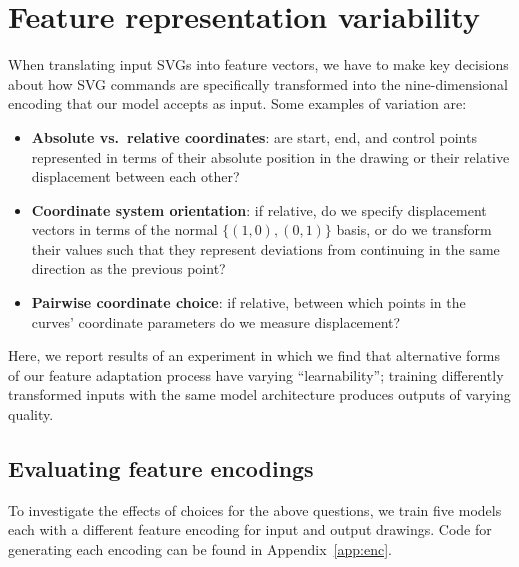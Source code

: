 \chapter{Feature representation variability}\label{chap:feature-variation}
When translating input SVGs into feature vectors, we have to make key decisions about how SVG commands are specifically transformed into the nine-dimensional encoding that our model accepts as input.
Some examples of variation are:

\begin{itemize}
\item \textbf{Absolute vs.\ relative coordinates}: are start, end, and control points represented in terms of their absolute position in the drawing or their relative displacement between each other?
\item \textbf{Coordinate system orientation}: if relative, do we specify displacement vectors in terms of the normal $\{(1, 0), (0, 1)\}$ basis, or do we transform their values such that they represent deviations from continuing in the same direction as the previous point?
\item \textbf{Pairwise coordinate choice}: if relative, between which points in the curves' coordinate parameters do we measure displacement?
\end{itemize}

Here, we report results of an experiment in which we find that alternative forms of our feature adaptation process have varying ``learnability''; training differently transformed inputs with the same model architecture produces outputs of varying quality.

\section{Evaluating feature encodings}\label{sec:eval-encs}
To investigate the effects of choices for the above questions, we train five models each with a different feature encoding for input and output drawings.
Code for generating each encoding can be found in Appendix~\ref{app:enc}.

